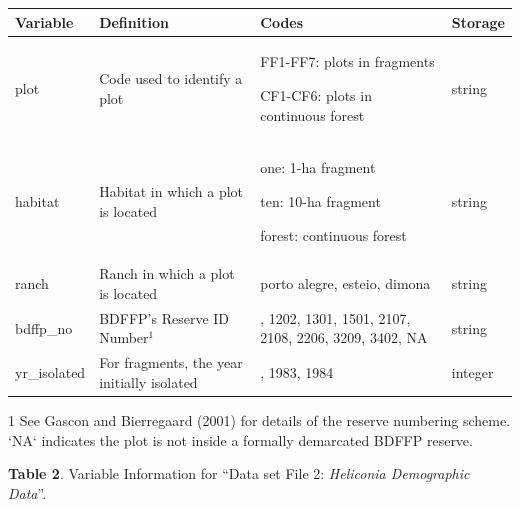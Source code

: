 \documentclass[
  12pt,
  man, donotrepeattitle,floatsintext]{apa6}
\begin{document}
\begin{threeparttable}
\begin{tabular}{>{\raggedright\arraybackslash}p{5em}>{\raggedright\arraybackslash}p{18em}>{\raggedright\arraybackslash}p{21em}>{\raggedright\arraybackslash}p{3em}}
\toprule
\textbf{Variable} & \textbf{Definition} & \textbf{Codes} & \textbf{Storage}\\
\midrule
plot & Code used to identify a plot & FF1-FF7: plots in fragments
  
CF1-CF6: plots in continuous forest & string\\
\midrule
habitat & Habitat in which a plot is located & one: 1-ha fragment
  
ten: 10-ha fragment
  
forest: continuous forest & string\\
\midrule
ranch & Ranch in which a plot is located & porto alegre, esteio, dimona & string\\
\midrule
bdffp\_no & BDFFP's Reserve ID Number$^{1}$ & 1104, 1202, 1301, 1501, 2107, 2108, 2206, 3209, 3402, NA & string\\
\midrule
yr\_isolated & For fragments, the year initially isolated & 1980, 1983, 1984 & integer\\
\bottomrule
\end{tabular}
\begin{tablenotes}
\item[1] See Gascon and Bierregaard (2001) for details of the reserve numbering scheme. `NA` indicates the plot is not inside a formally demarcated BDFFP reserve.
\end{tablenotes}
\end{threeparttable}

\newpage

\textbf{Table 2}. Variable Information for ``Data set File 2: \emph{Heliconia Demographic Data}''.
\renewcommand{\arraystretch}{0.75}
\end{document}
